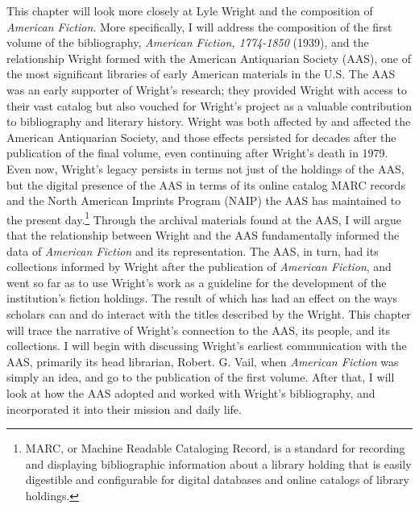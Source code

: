 This chapter will look more closely at Lyle Wright and the composition of \textit{American Fiction}. More specifically, I will address the composition of the first volume of the bibliography, \textit{American Fiction, 1774-1850} (1939), and the relationship Wright formed with the American Antiquarian Society (AAS), one of the most significant libraries of early American materials in the U.S. The AAS was an early supporter of Wright's research; they provided Wright with access to their vast catalog but also vouched for Wright's project as a valuable contribution to bibliography and literary history. Wright was both affected by and affected the American Antiquarian Society, and those effects persisted for decades after the publication of the final volume, even continuing after Wright's death in 1979. Even now, Wright's legacy persists in terms not just of the holdings of the AAS, but the digital presence of the AAS in terms of its online catalog MARC records and the North American Imprints Program (NAIP) the AAS has maintained to the present day.\footnote{MARC, or Machine Readable Cataloging Record, is a standard for recording and displaying bibliographic information about a library holding that is easily digestible and configurable for digital databases and online catalogs of library holdings.} Through the archival materials found at the AAS, I will argue that the relationship between Wright and the AAS fundamentally informed the data of \textit{American Fiction} and its representation. The AAS, in turn, had its collections informed by Wright after the publication of \textit{American Fiction}, and went so far as to use Wright's work as a guideline for the development of the institution's fiction holdings. The result of which has had an effect on the ways scholars can and do interact with the titles described by the Wright. This chapter will trace the narrative of Wright's connection to the AAS, its people, and its collections. I will begin with discussing Wright's earliest communication with the AAS, primarily its head librarian, Robert. G. Vail, when \textit{American Fiction} was simply an idea, and go to the publication of the first volume. After that, I will look at how the AAS adopted and worked with Wright's bibliography, and incorporated it into their mission and daily life. 


